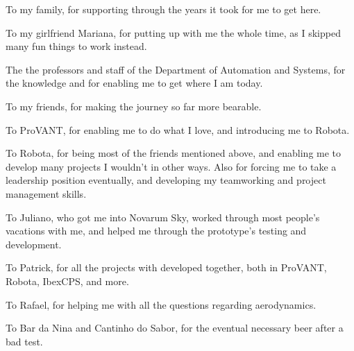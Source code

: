 \begin{agradecimentos}

To my family, for supporting through the years it took for me to get here.

To my girlfriend Mariana, for putting up with me the whole time, as I skipped many fun things to work instead.

The the professors and staff of the Department of Automation and Systems, for the knowledge and for enabling me to get where I am today.

To my friends, for making the journey so far more bearable.

To ProVANT, for enabling me to do what I love, and introducing me to Robota. 

To Robota, for being most of the friends mentioned above, and enabling me to develop many projects I wouldn't in other ways. Also for forcing me to take a leadership position eventually, and developing my teamworking and project management skills.

To Juliano, who got me into Novarum Sky, worked through most people's vacations with me, and helped me through the prototype's testing and development.

To Patrick, for all the projects with developed together, both in ProVANT, Robota, IbexCPS, and more.

To Rafael, for helping me with all the questions regarding aerodynamics.%

To Bar da Nina and Cantinho do Sabor, for the eventual necessary beer after a bad test.



\end{agradecimentos}
